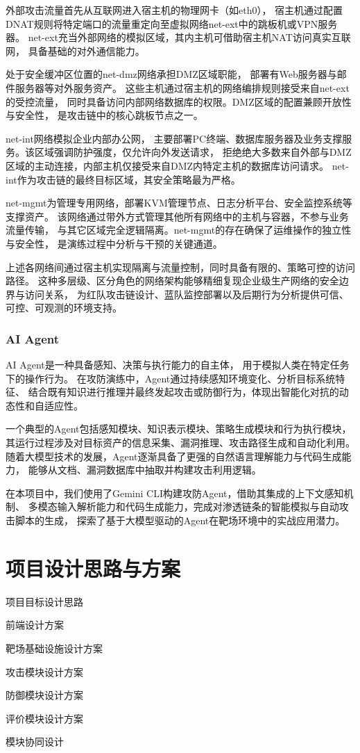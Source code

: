 \documentclass[lang=cn,10pt]{elegantbook}
\begin{document}
外部攻击流量首先从互联网进入宿主机的物理网卡（如eth0），
宿主机通过配置DNAT规则将特定端口的流量重定向至虚拟网络net-ext中的跳板机或VPN服务器。
net-ext充当外部网络的模拟区域，其内主机可借助宿主机NAT访问真实互联网，
具备基础的对外通信能力。

处于安全缓冲区位置的net-dmz网络承担DMZ区域职能，
部署有Web服务器与邮件服务器等对外服务资产。
这些主机通过宿主机的网络编排规则接受来自net-ext的受控流量，
同时具备访问内部网络数据库的权限。DMZ区域的配置兼顾开放性与安全性，
是攻击链中的核心跳板节点之一。

net-int网络模拟企业内部办公网，
主要部署PC终端、数据库服务器及业务支撑服务。该区域强调防护强度，仅允许向外发送请求，
拒绝绝大多数来自外部与DMZ区域的主动连接，内部主机仅接受来自DMZ内特定主机的数据库访问请求。
net-int作为攻击链的最终目标区域，其安全策略最为严格。

net-mgmt为管理专用网络，部署KVM管理节点、日志分析平台、安全监控系统等支撑资产。
该网络通过带外方式管理其他所有网络中的主机与容器，不参与业务流量传输，
与其它区域完全逻辑隔离。net-mgmt的存在确保了运维操作的独立性与安全性，
是演练过程中分析与干预的关键通道。

上述各网络间通过宿主机实现隔离与流量控制，同时具备有限的、策略可控的访问路径。
这种多层级、区分角色的网络架构能够精细复现企业级生产网络的安全边界与访问关系，
为红队攻击链设计、蓝队监控部署以及后期行为分析提供可信、可控、可观测的环境支持。


\subsection{AI Agent}

AI Agent是一种具备感知、决策与执行能力的自主体，
用于模拟人类在特定任务下的操作行为。
在攻防演练中，Agent通过持续感知环境变化、分析目标系统特征、
结合既有知识进行推理并最终发起攻击或防御行为，体现出智能化对抗的动态性和自适应性。

一个典型的Agent包括感知模块、知识表示模块、策略生成模块和行为执行模块，
其运行过程涉及对目标资产的信息采集、漏洞推理、攻击路径生成和自动化利用。
随着大模型技术的发展，Agent逐渐具备了更强的自然语言理解能力与代码生成能力，
能够从文档、漏洞数据库中抽取并构建攻击利用逻辑。

在本项目中，我们使用了Gemini CLI构建攻防Agent，借助其集成的上下文感知机制、
多模态输入解析能力和代码生成能力，完成对渗透链条的智能模拟与自动攻击脚本的生成，
探索了基于大模型驱动的Agent在靶场环境中的实战应用潜力。


\chapter{项目设计思路与方案}
\begin{introduction}
  \item 项目目标设计思路
  \item 前端设计方案
  \item 靶场基础设施设计方案
  \item 攻击模块设计方案
  \item 防御模块设计方案
  \item 评价模块设计方案
  \item 模块协同设计
\end{introduction}
\end{document}
